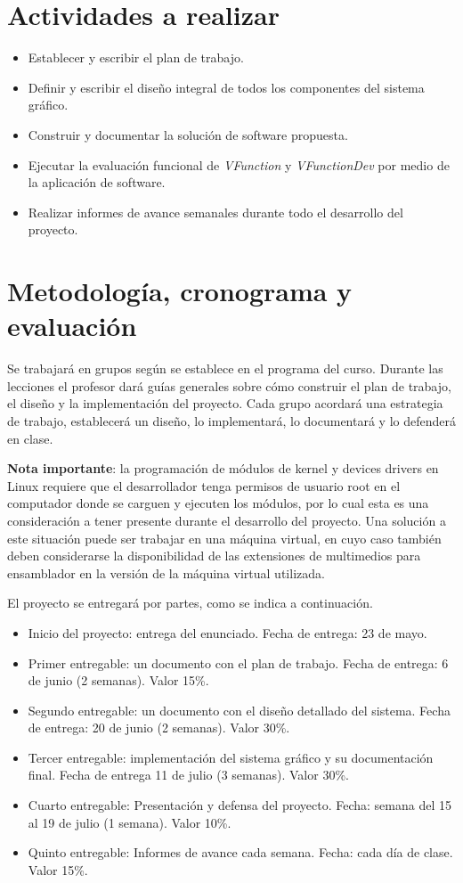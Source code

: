 \documentclass[12pt,letterpaper]{article}
\begin{document}
\section*{Actividades a realizar}
\begin{itemize}
 \item Establecer y escribir el plan de trabajo.
 \item Definir y escribir el diseño integral de todos los componentes del sistema gráfico.
 \item Construir y documentar la solución de software propuesta.
 \item Ejecutar la evaluación funcional de \textit{VFunction} y \textit{VFunctionDev} por medio de la aplicación de software.
 \item Realizar informes de avance semanales durante todo el desarrollo del proyecto.
\end{itemize}

\section*{Metodología, cronograma y evaluación}
Se trabajará en grupos según se establece en el programa del curso. Durante las lecciones el profesor dará guías generales sobre cómo construir el plan de trabajo, el diseño y la implementación del proyecto. Cada grupo acordará una estrategia de trabajo, establecerá un diseño, lo implementará, lo documentará y lo defenderá en clase. 

\textbf{Nota importante}: la programación de módulos de kernel y devices drivers en Linux requiere que el desarrollador tenga permisos de usuario root en el computador donde se carguen y ejecuten los módulos, por lo cual esta es una consideración a tener presente durante el desarrollo del proyecto. Una solución a este situación puede ser trabajar en una máquina virtual, en cuyo caso también deben considerarse la disponibilidad de las extensiones de multimedios para ensamblador en la versión de la máquina virtual utilizada.

El proyecto se entregará por partes, como se indica a continuación.
\begin{itemize}
 \item Inicio del proyecto: entrega del enunciado.
       Fecha de entrega: 23 de mayo.
 \item Primer entregable: un documento con el plan de trabajo.
       Fecha de entrega: 6 de junio (2 semanas). Valor 15\%.
 \item Segundo entregable: un documento con el diseño detallado del sistema.
       Fecha de entrega: 20 de junio (2 semanas). Valor 30\%.
 \item Tercer entregable: implementación del sistema gráfico y su documentación final. 
       Fecha de entrega 11 de julio (3 semanas). Valor 30\%.
 \item Cuarto entregable: Presentación y defensa del proyecto. 
       Fecha: semana del 15 al 19 de julio (1 semana). Valor 10\%.
 \item Quinto entregable: Informes de avance cada semana. 
       Fecha: cada día de clase. Valor 15\%.
\end{itemize}
\end{document}
